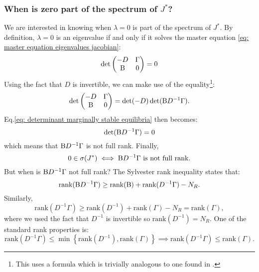 \documentclass[12pt, titlepage, twoside, openright]{report}
\begin{document}
\subsubsection{When is zero part of the spectrum of \texorpdfstring{$J^*$}{jstar}?}\label{sec : zero part of spectrum}
We are interested in knowing when $\lambda=0$ is part of the spectrum of $J^*$. By definition, $\lambda=0$ is an eigenvalue if and only if it solves the master equation \eqref{eq: master equation eigenvalues jacobian}:
\begin{equation}
\det
\begin{pmatrix}
  -D   & \Gamma \\
  \text{B} & 0
\end{pmatrix} = 0 \label{eq: determinant marginally stable equilibria}
\end{equation}
Using the fact that $D$ is invertible, we can make use of the equality\footnote{This uses a formula which is trivially analogous to one found in \cite{powell_calculating_2011}.}:
\begin{equation}
\det\begin{pmatrix}
  -D   & \Gamma \\
  \text{B} & 0
\end{pmatrix} = \det(-D)\det(\text{B} D^{-1}\Gamma).
\end{equation}
Eq.\eqref{eq: determinant marginally stable equilibria} then becomes:
\begin{equation}
\det(\text{B} D^{-1}\Gamma)=0
\end{equation}
which means that $\text{B} D^{-1}\Gamma$ is not full rank. Finally,
\begin{equation}
{
0 \in \sigma(J^*) \iff \text{B}D^{-1}\Gamma \text{ is not full rank.}\label{eq : condition zero in spectrum of J}
}
\end{equation}
But when is $\text{B} D^{-1}\Gamma$ not full rank? The Sylvester rank inequality \cite{thome_inequalities_2016} states that:
\begin{equation}
\text{rank}(\text{B} D^{-1}\Gamma) \geq \text{rank}(\text{B})+\text{rank}(D^{-1}\Gamma)
-N_R.
\end{equation}
Similarly,
\begin{equation}
\text{rank}(D^{-1}\Gamma) \geq \text{rank}(D^{-1})+\text{rank}(\Gamma)-N_R=\text{rank}(\Gamma),
\end{equation}
where we used the fact that $D^{-1}$ is invertible so $\text{rank}(D^{-1})=N_R$.
One of the standard rank properties is:
\begin{equation}
\text{rank}(D^{-1}\Gamma) \leq \min\left\{\text{rank}(D^{-1}), \text{rank}(\Gamma)\right\} \implies \text{rank}(D^{-1}\Gamma) \leq \text{rank}(\Gamma).
\end{equation}
\end{document}

